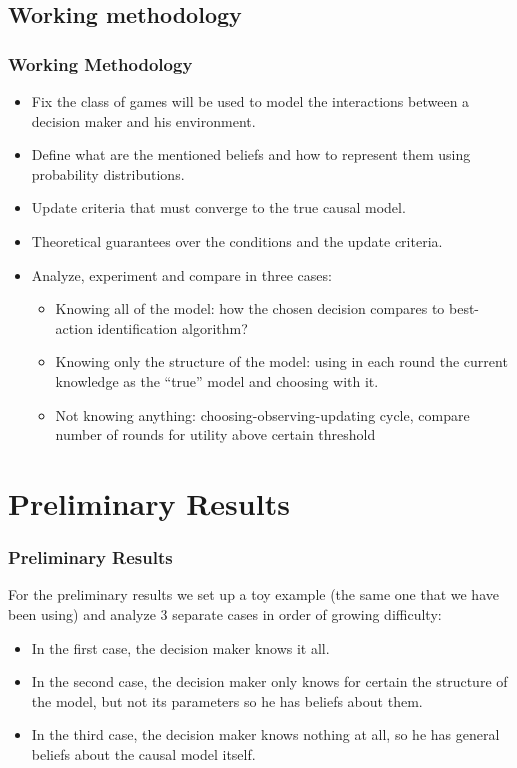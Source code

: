 \documentclass{beamer}
\theoremstyle{plain}
\begin{document}
\subsection{Working methodology}
\begin{frame}[allowframebreaks]
\frametitle{Working Methodology}
\begin{itemize}
\item Fix the class of games will be used to model the interactions between a decision maker and his environment.
\item Define what are the mentioned beliefs and how to represent them using probability distributions.
\item Update criteria that must converge to the true causal model.
\item Theoretical guarantees over the conditions and the update criteria.
\item Analyze, experiment and compare in three cases:
\begin{itemize}
	\item Knowing all of the model: how the chosen decision compares to best-action identification algorithm?
	\item Knowing only the structure of the model: using in each round the current knowledge as the “true” model and choosing with it.
	\item Not knowing anything: choosing-observing-updating cycle, compare number of rounds for utility above certain threshold
\end{itemize}
\end{itemize}
\end{frame}


\section{Preliminary Results}
\begin{frame}
\frametitle{Preliminary Results}
For the preliminary results we set up a toy example (the same one that we have been using) and analyze 3 separate cases in order of growing difficulty:
\begin{itemize}
\item In the first case, the decision maker knows it all.
\item In the second case, the decision maker only knows for certain the structure of the model, but not its parameters so he has beliefs about them.
\item In the third case, the decision maker knows nothing at all, so he has general beliefs about the causal model itself.
\end{itemize}
\end{frame}
\end{document}

